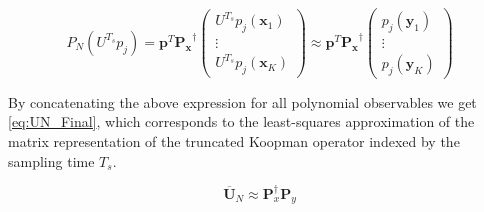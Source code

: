 \documentclass{article}
\begin{document}
        \begin{equation} \label{eq:PN_Min_j}
            P_N \left(U^{T_s} p_j\right) = \mathbf{p}^T \mathbf{P_x}^\dagger
                \begin{pmatrix}
                    U^{T_s} p_j\left(\mathbf{x}_1\right) \\
                    \vdots \\
                    U^{T_s} p_j\left(\mathbf{x}_K\right)
                \end{pmatrix}
            \approx \mathbf{p}^T \mathbf{P_x}^\dagger
                \begin{pmatrix}
                    p_j\left(\mathbf{y}_1\right) \\
                    \vdots \\
                    p_j\left(\mathbf{y}_K\right)
                \end{pmatrix}
        \end{equation}

        By concatenating the above expression for all polynomial observables we get \cref{eq:UN_Final}, which corresponds to the least-squares approximation of the matrix representation of the truncated Koopman operator indexed by the sampling time $T_s$.

        \begin{equation} \label{eq:UN_Final}
            \overline{\mathbf{U}}_N \approx \mathbf{P}_x^\dagger \mathbf{P}_y
        \end{equation}

    
\end{document}
